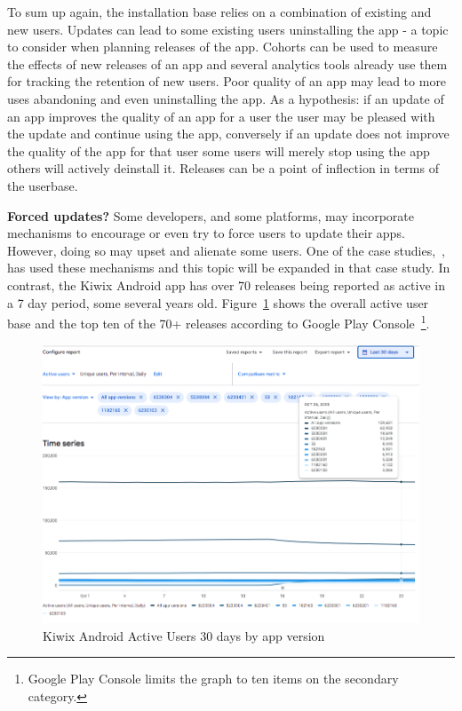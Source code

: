 To sum up again, the installation base relies on a combination of existing and new users. Updates can lead to some existing users uninstalling the app - a topic to consider when planning releases of the app. Cohorts can be used to measure the effects of new releases of an app and several analytics tools already use them for tracking the retention of new users. Poor quality of an app may lead to more uses abandoning and even uninstalling the app. As a hypothesis: if an update of an app improves the quality of an app for a user the user may be pleased with the update and continue using the app, conversely if an update does not improve the quality of the app for that user some users will merely stop using the app others will actively deinstall it. Releases can be a point of inflection in terms of the userbase.

\textbf{Forced updates?} Some developers, and some platforms, may incorporate mechanisms to encourage or even try to force users to update their apps. However, doing so may upset and alienate some users. One of the case studies,~\href{study-greentech-apps}{\emph{}}, has used these mechanisms and this topic will be expanded in that case study. In contrast, the Kiwix Android app has over 70 releases being reported as active in a 7 day period, some several years old. Figure~\ref{fig:kiwix-30d-active-users} shows the overall active user base and the top ten of the 70+ releases according to Google Play Console~\footnote{Google Play Console limits the graph to ten items on the secondary category.}.

\begin{figure}[htbp!]
    \centering
    \includegraphics[width=15.5cm]{images/android-vitals-screenshots/kiwix-ActiveUsers-30-days-2020-10-29.png}
    \caption{Kiwix Android Active Users 30 days by app version}
    \label{fig:kiwix-30d-active-users}
\end{figure}

